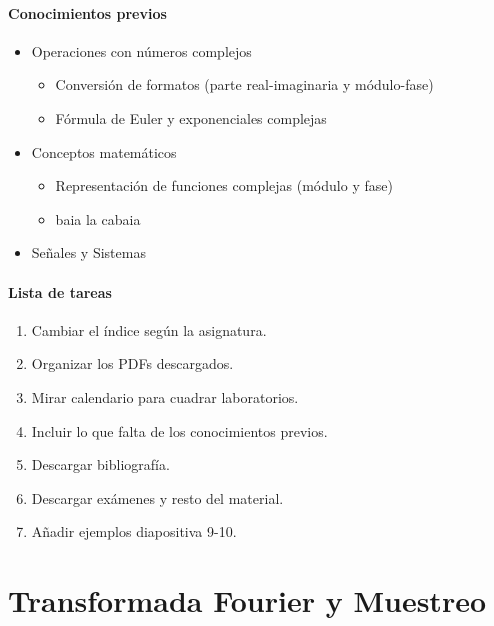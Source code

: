 \documentclass[a4paper]{book}
\begin{document}
\subsubsection{Conocimientos previos} \vspace{\parskip}
\begin{itemize}
	 \item Operaciones con números complejos
	 \begin{itemize}
		  \item Conversión de formatos (parte real-imaginaria y módulo-fase)
		  \item Fórmula de Euler y exponenciales complejas
	 \end{itemize}
	 \item Conceptos matemáticos
	 \begin{itemize}
		  \item Representación de funciones complejas (módulo y fase)
		  \item baia la cabaia
	 \end{itemize}
	 \item Señales y Sistemas
\end{itemize}

\subsubsection{Lista de tareas} \vspace{\parskip}
\begin{enumerate}
	 \item Cambiar el índice según la asignatura.
	 \item Organizar los PDFs descargados.
	 \item Mirar calendario para cuadrar laboratorios.
	 \item Incluir lo que falta de los conocimientos previos.
	 \item Descargar bibliografía.
	 \item Descargar exámenes y resto del material.
	 \item Añadir ejemplos diapositiva 9-10.
\end{enumerate}
\newpage

\setlength{\parskip}{0em}
\tableofcontents 
\setlength{\parskip}{0.5em}


\chapter*{Transformada Fourier y Muestreo}
\end{document}
